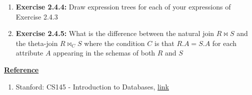 \documentclass[12pt]{article}
\begin{document}
\begin{enumerate}[1.]
    \item \textbf{Exercise 2.4.4:} Draw expression trees for each of your expressions of
    Exercise 2.4.3

    \item \textbf{Exercise 2.4.5:} What is the difference between the natural join $R \bowtie S$ and the
    theta-join $R \bowtie_C S$ where the condition $C$ is that $R.A = S.A$ for
    each attribute $A$ appearing in the schemas of both $R$ and $S$
\end{enumerate}

\bigskip

\underline{\textbf{Reference}}

\bigskip

\begin{enumerate}[1)]
    \item Stanford: CS145 - Introduction to Databases, \href{http://infolab.stanford.edu/~ullman/fcdb/aut07/index.html}{link}
\end{enumerate}
\end{document}
